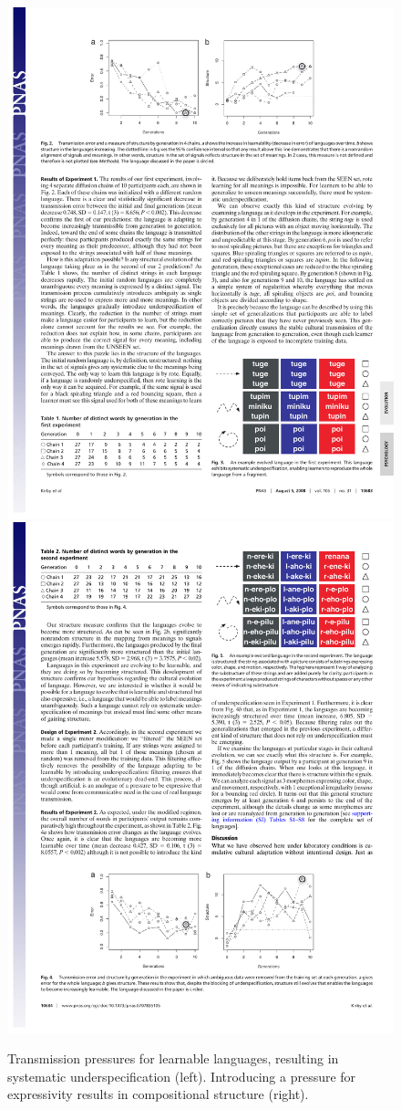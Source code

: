 \documentclass{../src/bcthesispart}
\begin{document}
\begin{figure}
	\includegraphics[width=.45\textwidth]{../figures/CH5-kirby2008-fig1}
	\hfill
	\includegraphics[width=.45\textwidth]{../figures/CH5-kirby2008-fig2}
	\caption{Transmission pressures for learnable languages, resulting in systematic underspecification (left). 
	Introducing a pressure for expressivity results in compositional structure (right).
	}
\end{figure}
\end{document}
